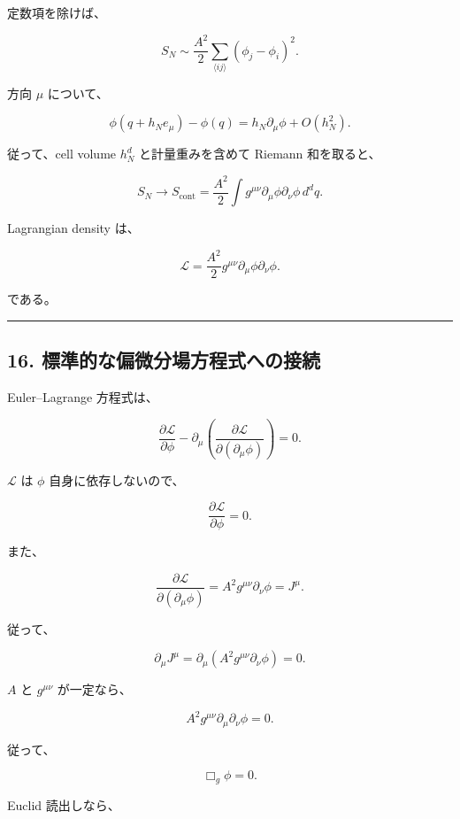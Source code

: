 \documentclass[
  a4paper,
]{ltjsarticle}
\begin{document}
定数項を除けば、

\[
S_N
\sim
\frac{A^2}{2}
\sum_{\langle ij\rangle}
(\phi_j-\phi_i)^2.
\tag{54}
\]

方向 \(\mu\) について、

\[
\phi(q+h_Ne_\mu)-\phi(q)
=
h_N\partial_\mu\phi
+
O(h_N^2).
\]

従って、cell volume \(h_N^d\) と計量重みを含めて Riemann 和を取ると、

\[
\boxed{
S_N
\longrightarrow
S_{\mathrm{cont}}
=
\frac{A^2}{2}
\int
g^{\mu\nu}
\partial_\mu\phi
\partial_\nu\phi
\,d^dq.
}
\tag{55}
\]

Lagrangian density は、

\[
\boxed{
\mathcal L
=
\frac{A^2}{2}
g^{\mu\nu}
\partial_\mu\phi
\partial_\nu\phi.
}
\tag{56}
\]

である。

\begin{center}\rule{0.5\linewidth}{0.5pt}\end{center}

\subsection{16.
標準的な偏微分場方程式への接続}\label{ux6a19ux6e96ux7684ux306aux504fux5faeux5206ux5834ux65b9ux7a0bux5f0fux3078ux306eux63a5ux7d9a}

Euler--Lagrange 方程式は、

\[
\frac{\partial\mathcal L}{\partial\phi}
-
\partial_\mu
\left(
\frac{\partial\mathcal L}
{\partial(\partial_\mu\phi)}
\right)
=
0.
\tag{57}
\]

\(\mathcal L\) は \(\phi\) 自身に依存しないので、

\[
\frac{\partial\mathcal L}{\partial\phi}=0.
\]

また、

\[
\frac{\partial\mathcal L}
{\partial(\partial_\mu\phi)}
=
A^2g^{\mu\nu}\partial_\nu\phi
=
J^\mu.
\tag{58}
\]

従って、

\[
\boxed{
\partial_\mu J^\mu
=
\partial_\mu
\left(
A^2g^{\mu\nu}\partial_\nu\phi
\right)
=
0.
}
\tag{59}
\]

\(A\) と \(g^{\mu\nu}\) が一定なら、

\[
A^2
g^{\mu\nu}
\partial_\mu\partial_\nu\phi
=
0.
\]

従って、

\[
\boxed{
\Box_g\phi=0.
}
\tag{60}
\]

Euclid 読出しなら、
\end{document}
